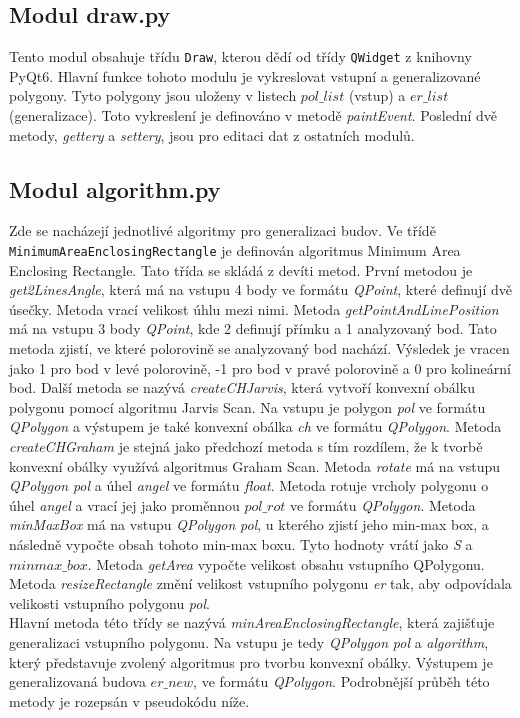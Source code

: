 \documentclass{article}
\begin{document}
\subsection{\small{Modul draw.py}}
Tento modul obsahuje třídu \texttt{Draw}, kterou dědí od třídy \texttt{QWidget} z knihovny PyQt6. Hlavní funkce tohoto modulu je vykreslovat vstupní a generalizované polygony. Tyto polygony jsou uloženy v listech $pol\_list$ (vstup) a $er\_list$ (generalizace). Toto vykreslení je definováno v metodě \emph{paintEvent}. Poslední dvě metody, \emph{gettery} a \emph{settery}, jsou pro editaci dat z ostatních modulů.
\subsection{\small{Modul algorithm.py}}
Zde se nacházejí jednotlivé algoritmy pro generalizaci budov. Ve třídě \texttt{MinimumAreaEnclosingRectangle} je definován algoritmus Minimum Area Enclosing Rectangle. Tato třída se skládá z devíti metod. První metodou je \emph{get2LinesAngle}, která má na vstupu 4 body ve formátu \emph{QPoint}, které definují dvě úsečky. Metoda vrací velikost úhlu mezi nimi. Metoda \emph{getPointAndLinePosition} má na vstupu 3 body \emph{QPoint}, kde 2 definují přímku a 1 analyzovaný bod. Tato metoda zjistí, ve které polorovině se analyzovaný bod nachází. Výsledek je vracen jako 1 pro bod v levé polorovině, -1 pro bod v pravé polorovině a 0 pro kolineární bod. Další metoda se nazývá \emph{createCHJarvis}, která vytvoří konvexní obálku polygonu pomocí algoritmu Jarvis Scan. Na vstupu je polygon \emph{pol} ve formátu \emph{QPolygon} a výstupem je také konvexní obálka \emph{ch} ve formátu \emph{QPolygon}. Metoda \emph{createCHGraham} je stejná jako předchozí metoda s tím rozdílem, že k tvorbě konvexní obálky využívá algoritmus Graham Scan. Metoda \emph{rotate} má na vstupu \emph{QPolygon} \emph{pol} a úhel \emph{angel} ve formátu \emph{float}. Metoda rotuje vrcholy polygonu o úhel \emph{angel} a vrací jej jako proměnnou $pol\_rot$ ve formátu \emph{QPolygon}. Metoda \emph{minMaxBox} má na vstupu \emph{QPolygon} \emph{pol}, u kterého zjistí jeho min-max box, a následně vypočte obsah tohoto min-max boxu. Tyto hodnoty vrátí jako \emph{S} a $minmax\_box$. Metoda \emph{getArea} vypočte velikost obsahu vstupního QPolygonu. Metoda \emph{resizeRectangle} změní velikost vstupního polygonu \emph{er} tak, aby odpovídala velikosti vstupního polygonu \emph{pol}.\\
Hlavní metoda této třídy se nazývá \emph{minAreaEnclosingRectangle}, která zajišťuje generalizaci vstupního polygonu. Na vstupu je tedy \emph{QPolygon} \emph{pol} a \emph{algorithm}, který představuje zvolený algoritmus pro tvorbu konvexní obálky. Výstupem je generalizovaná budova $er\_new$, ve formátu \emph{QPolygon}. Podrobnější průběh této metody je rozepsán v pseudokódu níže.\\
\end{document}
